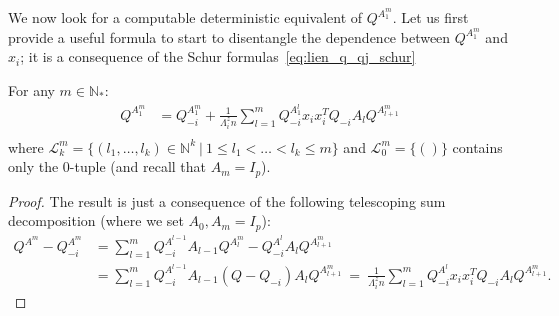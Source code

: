 \documentclass[a4papaer, titlepage]{book}
\begin{document}
We now look for a computable deterministic equivalent of $Q^{A_1^m}$. Let us first provide a useful formula to start to disentangle the dependence between $Q^{A_1^m}$ and $x_i$; it is a consequence of the Schur formulas~\eqref{eq:lien_q_qj_schur}
\begin{lemma}\label{lem:telescopage_Q^mi_m_x_Q^m}
  For any $ m \in \mathbb N_*$:
\begin{align*}
  Q^{A_1^{m}}
  &=Q_{-i}^{A_1^{m}}
  +\frac{1}{\Lambda_i^zn}\sum_{l=1}^{m} Q_{-i}^{A_1^{l}}x_ix_i^TQ_{-i}A_lQ^{A^{m}_{l+1}}\\%
\end{align*}
where $\mathcal L_k^m=\{(l_1,\ldots , l_k)\in \mathbb N^k \  \vert \ 1\leq l_1 <\ldots <l_k\leq m\}$ and $\mathcal L_0^m = \{()\}$ contains only the $0$-tuple (and recall that $A_m = I_p$). 
\end{lemma}
\begin{proof}
  The result is just a consequence of the following telescoping sum decomposition (where we set $A_0,A_m=I_p$):
  \begin{align*}
      Q^{A^{m}}-Q_{-i}^{A^{m}}
      &=\sum_{l=1}^m Q_{-i}^{A^{l-1}}A_{l-1}Q^{A^{m}_{l}}-Q_{-i}^{A^{l}}A_lQ^{A^{m}_{l+1}} \\
      &=\sum_{l=1}^m Q_{-i}^{A^{l-1}}A_{l-1}(Q-Q_{-i})A_{l}Q^{A^{m}_{l+1}}
      \ =  \ \frac{1}{\Lambda_i^zn}\sum_{l=1}^m Q_{-i}^{A^{l}}x_ix_i^TQ_{-i} A_lQ^{A^{m}_{l+1}}.
  \end{align*}
\end{proof}
\end{document}
